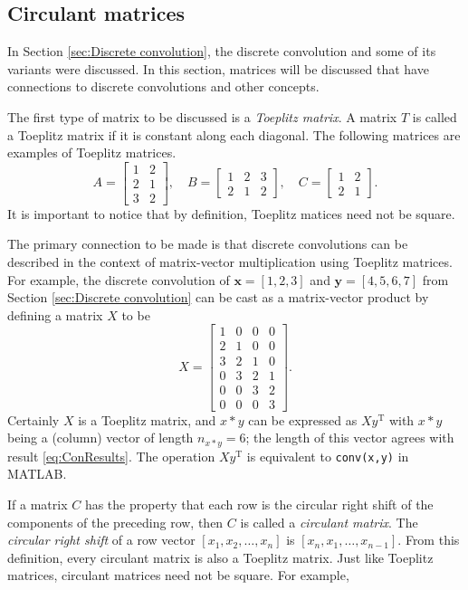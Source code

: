 \documentclass[12pt]{article}
\newcommand{\trans}{\mathrm{T}}	%
\begin{document}
\subsection{Circulant matrices} \label{sec:Circulant matrices}
In Section \ref{sec:Discrete convolution}, the discrete convolution and some of its variants were discussed. In this section, matrices will be discussed that have connections to discrete convolutions and other concepts. \par 
The first type of matrix to be discussed is a \textit{Toeplitz matrix}. A matrix $T$ is called a Toeplitz matrix if it is constant along each diagonal. The following matrices are examples of Toeplitz matrices.
\[A = \begin{bmatrix}
1 & 2 \\
2 & 1 \\
3 & 2
\end{bmatrix}, \quad 
B = \begin{bmatrix}
1 & 2 & 3 \\
2 & 1 & 2 
\end{bmatrix}, \quad 
C = \begin{bmatrix}
1 &  2 \\
2 & 1
\end{bmatrix}.\]
It is important to notice that by definition, Toeplitz matices need not be square. \par 
The primary connection to be made is that discrete convolutions can be described in the context of matrix-vector multiplication using Toeplitz matrices. For example, the discrete convolution of $\mathbf{x} = [1,2,3]$ and $\mathbf{y} = [4,5,6,7]$ from Section \ref{sec:Discrete convolution} can be cast as a matrix-vector product by defining a matrix $X$ to be
\[X = \begin{bmatrix}
1 & 0 & 0 & 0 \\
2 & 1 & 0 & 0 \\
3 & 2 & 1 & 0 \\
0 & 3 & 2 & 1 \\
0 & 0 & 3 & 2 \\
0 & 0 & 0 & 3
\end{bmatrix}.\]
Certainly $X$ is a Toeplitz matrix, and $x*y$ can be expressed as $Xy^\trans$ with $x*y$ being a (column) vector of length $n_{x*y} = 6$; the length of this vector agrees with result \eqref{eq:ConResults}. The operation $Xy^\trans$ is equivalent to \texttt{conv(x,y)} in MATLAB. \par 
If a matrix $C$ has the property that each row is the circular right shift of the components of the preceding row, then $C$ is called a \textit{circulant matrix}. The \textit{circular right shift} of a row vector $[x_1,x_2,\ldots,x_n]$ is $[x_n,x_1,\ldots,x_{n-1}]$. From this definition, every circulant matrix is also a Toeplitz matrix. Just like Toeplitz matrices, circulant matrices need not be square. For example,
\end{document}
